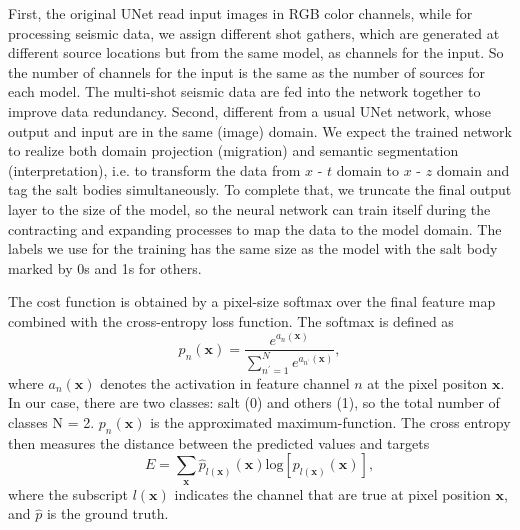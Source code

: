 \documentclass[manuscript,ulem,graphix,revised]{geophysics}
\begin{document}
First, the original UNet read input images in RGB color channels, while for processing seismic data, we assign different shot gathers, which are generated at different source locations but from the same model, as channels for the input. So the number of channels for the input is the same as the number of sources for each model. The multi-shot seismic data are fed into the network together to improve data redundancy. Second, different from a usual UNet network, whose output and input are in the same (image) domain. We expect the trained network to realize both domain projection (migration) and semantic segmentation (interpretation), i.e. to transform the data from $x$ - $t$ domain to $x$ - $z$ domain and tag the salt bodies simultaneously. To complete that, we truncate the final output layer to the size of the model, so the neural network can train itself during the contracting and expanding processes to map the data to the model domain.
The labels we use for the training has the same size as the model with the salt body marked by 0s and 1s for others.

The cost function is obtained by a pixel-size softmax over the final feature map combined with the cross-entropy loss function. The softmax is defined as 
\begin{equation}
p_n(\boldsymbol{x})=\frac{e^{{a_n(\boldsymbol{x})}}}{\sum_{n^\prime=1}^{N}e^{a_{n^\prime}(\boldsymbol{x})}},
\label{eqn:softmax}
\end{equation}
where $a_{n}(\boldsymbol{x})$ denotes the activation in feature channel $n$ at the pixel positon $\boldsymbol{x}$. In our case, there are two classes: salt (0) and others (1), so the total number of classes N = 2. $p_n(\boldsymbol{x})$ is the approximated maximum-function. The cross entropy then measures the distance between the predicted values and targets
\begin{equation}
E=\sum_{\boldsymbol{x}}
	\hat{p}_{l(\boldsymbol{x})}(\boldsymbol{x})
	\mathrm{log}[
	p_{l(\boldsymbol{x})}(\boldsymbol{x})
	],
\label{eqn:crossentropy}
\end{equation}
where the subscript $l(\boldsymbol{x})$ indicates the channel that are true at pixel position $\boldsymbol{x}$, and $\hat{p}$ is the ground truth.
\end{document}

